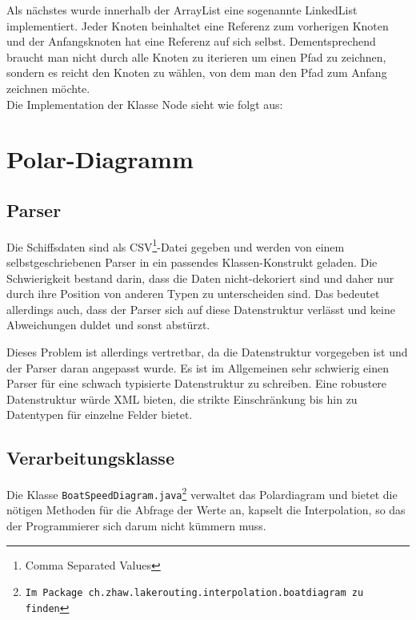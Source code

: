 Als nächstes wurde innerhalb der ArrayList eine sogenannte LinkedList implementiert. Jeder Knoten beinhaltet eine Referenz zum vorherigen Knoten und der Anfangsknoten hat eine Referenz auf sich selbst. Dementsprechend braucht man nicht durch alle Knoten zu iterieren um einen Pfad zu zeichnen, sondern es reicht den Knoten zu wählen, von dem man den Pfad zum Anfang zeichnen möchte. \\

Die Implementation der Klasse Node sieht wie folgt aus:



\section{Polar-Diagramm}
\subsection{Parser}
Die Schiffsdaten sind als CSV\footnote{Comma Separated Values}-Datei gegeben
und werden von einem selbst\-geschriebenen Parser in ein passendes
Klassen-Konstrukt geladen. Die Schwierigkeit bestand darin, dass die Daten
nicht-dekoriert sind und daher nur durch ihre Position von anderen Typen zu
unterscheiden sind. Das bedeutet allerdings auch, dass der Parser sich auf
diese Datenstruktur verlässt und keine Abweichungen duldet und sonst abstürzt.

Dieses Problem ist allerdings vertretbar, da die Datenstruktur vorgegeben ist
und der Parser daran angepasst wurde. Es ist im Allgemeinen sehr schwierig
einen Parser für eine schwach typisierte Datenstruktur zu schreiben. Eine
robustere Datenstruktur würde XML bieten, die strikte Einschränkung bis hin zu
Datentypen für einzelne Felder bietet.

\subsection{Verarbeitungsklasse}
Die Klasse \texttt{BoatSpeedDiagram.java\footnote{Im Package
ch.zhaw.lakerouting.interpolation.boatdiagram zu finden}} verwaltet das
Polardiagram und bietet die nötigen Methoden für die Abfrage der Werte an,
kapselt die Interpolation, so das der Programmierer sich darum nicht kümmern
muss.

